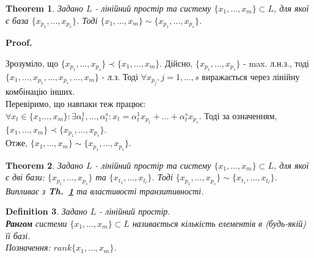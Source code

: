 \documentclass[a4paper, 10pt]{article}
\makeatletter
\theoremstyle{theoremdd}
\newtheorem{theorem}{Theorem}[subsection]
\newtheorem{definition}[theorem]{Definition}
\newcommand\thref[1]{\textbf{Th.~\ref{#1}}}
\renewenvironment{proof}[1][Proof.\\]{\par
\pushQED{\hfill \qed}%
\normalfont \topsep6\p@\@plus6\p@\relax
\trivlist
\item\relax
{\bfseries
#1\@addpunct{.}}\hspace\labelsep\ignorespaces
}{%
\popQED\endtrivlist\@endpefalse
}
\makeatother
\begin{document}
	\begin{theorem}
	\label{two_bases_equivalent}
	Задано $L$ - лінійний простір та систему $\{x_1, \dots, x_m\} \subset L$, для якої є база $\{x_{p_1}, \dots, x_{p_s}\}$. Тоді $\{x_1, \dots, x_m\} \sim \{x_{p_1}, \dots, x_{p_s}\}$.
	\end{theorem}
	
	\begin{proof}
	Зрозуміло, що $\{x_{p_1}, \dots, x_{p_s} \} \prec \{x_1, \dots, x_m \}$. Дійсно, $\{x_{p_1}, \dots, x_{p_s}\}$ - max. л.н.з., тоді $\{x_1,\dots,x_{p_1},\dots,x_{p_s},\dots,x_m\}$ - л.з. Тоді $\forall x_{p_j}, j=1,\dots,s$ виражається через лінійну комбінацію інших.\\
	Перевіримо, що навпаки теж працює:\\
	$\forall x_t \in \{x_1 \dots, x_m\}: \exists \alpha^1_t, \dots, \alpha^s_t: x_t = \alpha^1_t x_{p_1} + \dots + \alpha^s_t x_{p_s}$. Тоді за означенням, $\{x_1, \dots, x_m \} \prec \{x_{p_1}, \dots, x_{p_s} \}$.\\
	Отже, $\{x_1, \dots, x_m \} \sim \{x_{p_1}, \dots, x_{p_s} \}$.
	\end{proof}
	
	\begin{theorem}
	Задано $L$ - лінійний простір та систему $\{x_1, \dots, x_m\} \subset L$, для якої є дві бази: $\{x_{p_1}, \dots, x_{p_s}\}$ та $\{x_{t_1}, \dots, x_{t_l}\}$. Тоді
	$\{x_{p_1}, \dots, x_{p_s}\} \sim \{x_{t_1}, \dots, x_{t_l}\}$.\\
	\textit{Випливає з} \thref{two_bases_equivalent} \textit{та властивості транзитивності.}
	\end{theorem}
	
	\begin{definition}
	Задано $L$ - лінійний простір.\\
	\textbf{Рангом} системи $\{x_1, \dots, x_m\} \subset L$ називається кількість елементів в (будь-якій) її базі.\\
	Позначення: $rank\{x_1, \dots, x_m\}$.
	\end{definition}
	
\end{document}
